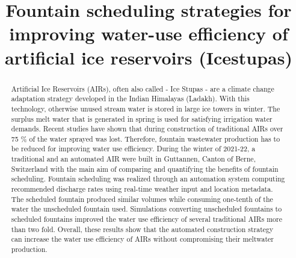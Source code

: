\documentclass[tc, manuscript]{copernicus}
\begin{document}
\title{Fountain scheduling strategies for improving water-use efficiency of artificial ice reservoirs (Icestupas)}

\def\Authors{Suryanarayanan Balasubramanian\,$^{1,2}$, Martin Hoelzle\,$^{1}$Roger Waser\,$^{3}$}

\def\Address{$^{1}$University of Fribourg, Department of Geosciences, Fribourg, Switzerland $^{2}$University of
Applied Sciences and Arts, Luzern, Switzerland} \def\corrAuthor{Suryanarayanan Balasubramanian}





\maketitle

\begin{abstract}

  Artificial Ice Reservoirs (AIRs), often also called - Ice Stupas - are a climate change adaptation strategy
  developed in the Indian Himalayas (Ladakh). With this technology, otherwise unused stream water is stored in
  large ice towers in winter. The surplus melt water that is generated in spring is used for satisfying
  irrigation water demands. Recent studies have shown that during construction of traditional AIRs over 75 \% of
  the water sprayed was lost. Therefore, fountain wastewater production has to be reduced for improving water
  use efficiency.  During the winter of 2021-22, a traditional and an automated AIR were built in Guttannen,
  Canton of Berne, Switzerland with the main aim of comparing and quantifying the benefits of fountain
  scheduling. Fountain scheduling was realized through an automation system computing recommended discharge
  rates using real-time weather input and location metadata. The scheduled fountain produced similar volumes
  while consuming one-tenth of the water the unscheduled fountain used. Simulations converting unscheduled
  fountains to scheduled fountains improved the water use efficiency of several traditional AIRs more than two
  fold. Overall, these results show that the automated construction strategy can increase the water use
  efficiency of AIRs without compromising their meltwater production.

\end{abstract}
\end{document}
